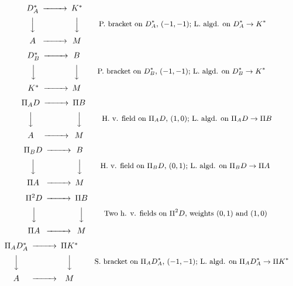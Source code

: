\documentclass[12pt,reqno,a4paper]{amsart}
\theoremstyle{definition}
\begin{document}
\begin{equation} \label{eq.lieandpoiss}
    \begin{CD} D^{*}_{A}@>>>  K^*\\
                @VVV  @VVV \\
                A@>>>M
    \end{CD} \qquad \text{\small P. bracket on $D^*_A$, $(-1,-1)$; L. algd. on $D^*_A\to K^*$}
\end{equation}

\begin{equation} \label{eq.poissandlie}
    \begin{CD} D^{*}_{B}@>>>  B\\
                @VVV  @VVV \\
                K^*@>>>M
    \end{CD} \qquad \text{\small P. bracket on $D^*_B$, $(-1,-1)$; L. algd. on $D^*_B\to K^*$}
\end{equation}

\begin{equation} \label{eq.dv2and3}
    \begin{CD} \Pi_AD@>>> \Pi B\\
                @VVV  @VVV \\
                A@>>>M
    \end{CD} \qquad \text{\small H. v. field on $\Pi_AD$, $(1,0)$; L. algd. on $\Pi_AD\to \Pi B$}
\end{equation}

\begin{equation}
    \begin{CD} \Pi_BD@>>>  B\\
                @VVV  @VVV \\
                \Pi A@>>>M
    \end{CD} \qquad \text{\small H. v. field on $\Pi_BD$, $(0,1)$; L. algd. on $\Pi_BD\to \Pi A$}
\end{equation}

\begin{equation} \label{eq.pikvadratt}
    \begin{CD} \Pi^2D@>>>  \Pi B\\
                @VVV  @VVV \\
                \Pi A@>>>M
    \end{CD} \qquad \text{\small Two h. v. fields on $\Pi^2D$, weights $(0,1)$ and $(1,0)$}
\end{equation}

\begin{equation} \label{eq.dv7}
    \begin{CD} \Pi_AD^{*}_{A}@>>>  \Pi K^*\\
                @VVV  @VVV \\
                A@>>>M
    \end{CD} \qquad \text{\small S. bracket on $\Pi_AD^{*}_{A}$, $(-1,-1)$; L. algd. on $\Pi_AD^{*}_{A}\to \Pi K^*$}
\end{equation}
\end{document}
